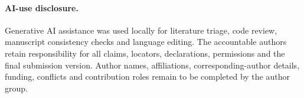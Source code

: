 \documentclass[pdflatex,iicol,sn-mathphys-num]{sn-jnl}
\begin{document}
\paragraph{AI-use disclosure.}
Generative AI assistance was used locally for literature triage, code review,
manuscript consistency checks and language editing. The accountable authors
retain responsibility for all claims, locators, declarations, permissions and
the final submission version.
Author names, affiliations, corresponding-author details, funding, conflicts and
contribution roles remain to be completed by the author group.

\small
\enlargethispage{8\baselineskip}
\tiny

\end{document}
